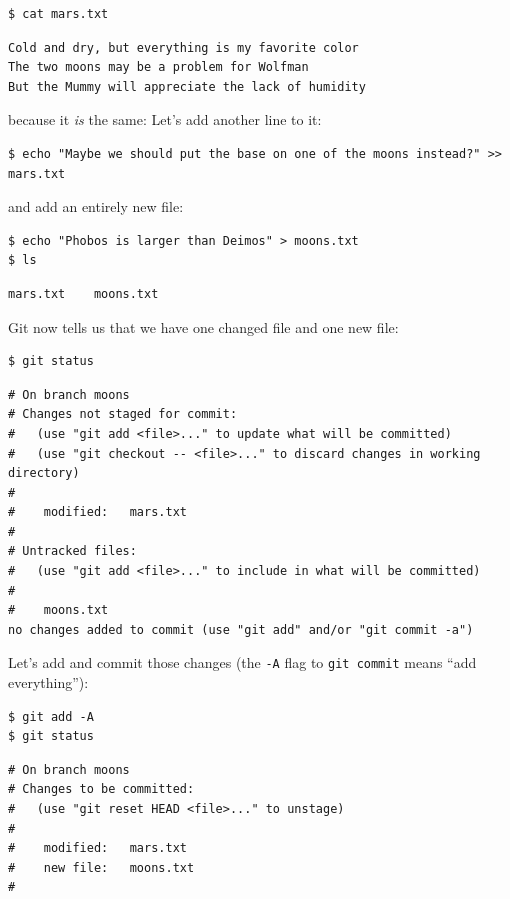 \documentclass{book}
\begin{document}
\begin{verbatim}
$ cat mars.txt
\end{verbatim}

\begin{verbatim}
Cold and dry, but everything is my favorite color
The two moons may be a problem for Wolfman
But the Mummy will appreciate the lack of humidity
\end{verbatim}

because it \emph{is} the same: Let's add another line to it:

\begin{verbatim}
$ echo "Maybe we should put the base on one of the moons instead?" >> mars.txt
\end{verbatim}

and add an entirely new file:

\begin{verbatim}
$ echo "Phobos is larger than Deimos" > moons.txt
$ ls
\end{verbatim}

\begin{verbatim}
mars.txt    moons.txt
\end{verbatim}

Git now tells us that we have one changed file and one new file:

\begin{verbatim}
$ git status
\end{verbatim}

\begin{verbatim}
# On branch moons
# Changes not staged for commit:
#   (use "git add <file>..." to update what will be committed)
#   (use "git checkout -- <file>..." to discard changes in working directory)
#
#    modified:   mars.txt
#
# Untracked files:
#   (use "git add <file>..." to include in what will be committed)
#
#    moons.txt
no changes added to commit (use "git add" and/or "git commit -a")
\end{verbatim}

Let's add and commit those changes (the \texttt{-A} flag to
\texttt{git commit} means ``add everything''):

\begin{verbatim}
$ git add -A
$ git status
\end{verbatim}

\begin{verbatim}
# On branch moons
# Changes to be committed:
#   (use "git reset HEAD <file>..." to unstage)
#
#    modified:   mars.txt
#    new file:   moons.txt
#
\end{verbatim}
\end{document}
